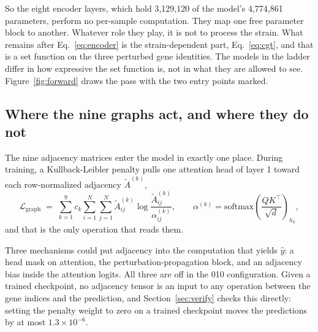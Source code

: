 So the eight encoder layers, which hold 3{,}129{,}120 of the model's 4{,}774{,}861
parameters, perform no per-sample computation. They map one free parameter block to
another. Whatever role they play, it is not to process the strain. What remains
after Eq.~\ref{eq:encoder} is the strain-dependent part, Eq.~\ref{eq:cgt}, and that
is a set function on the three perturbed gene identities. The models in the ladder
differ in how expressive the set function is, not in what they are allowed to see.
Figure~\ref{fig:forward} draws the pass with the two entry points marked.


\subsection{Where the nine graphs act, and where they do not}
\label{sec:graphs}

The nine adjacency matrices enter the model in exactly one place. During training,
a Kullback-Leibler penalty pulls one attention head of layer 1 toward each
row-normalized adjacency $\tilde{A}^{(k)}$,
%
\begin{equation}
  \mathcal{L}_{\mathrm{graph}} \;=\; \sum_{k=1}^{9} c_k
  \sum_{i=1}^{N} \sum_{j=1}^{N}
  \tilde{A}^{(k)}_{ij} \log \frac{\tilde{A}^{(k)}_{ij}}{\alpha^{(k)}_{ij}},
  \qquad
  \alpha^{(k)} = \mathrm{softmax}\!\left(\frac{QK^{\top}}{\sqrt{d}}\right)_{\!h_k},
  \label{eq:graphreg}
\end{equation}
%
and that is the only operation that reads them.

Three mechanisms could put adjacency into the computation that yields $\hat{y}$: a
head mask on attention, the perturbation-propagation block, and an adjacency bias
inside the attention logits. All three are off in the 010 configuration. Given a
trained checkpoint, no adjacency tensor is an input to any operation between the
gene indices and the prediction, and Section~\ref{sec:verify} checks this directly:
setting the penalty weight to zero on a trained checkpoint moves the predictions by
at most $1.3 \times 10^{-6}$.

